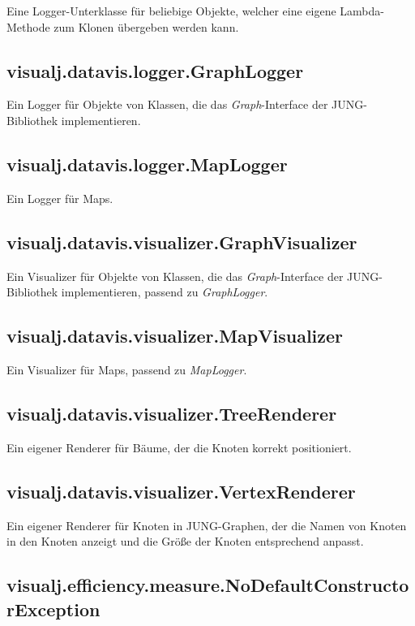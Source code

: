 \documentclass[a4paper]{report}
\begin{document}
Eine Logger-Unterklasse für beliebige Objekte, welcher eine eigene Lambda-Methode zum Klonen übergeben werden kann.

\subsection{visualj.datavis.logger.GraphLogger}

Ein Logger für Objekte von Klassen, die das \emph{Graph}-Interface der JUNG-Bibliothek implementieren.

\subsection{visualj.datavis.logger.MapLogger}

Ein Logger für Maps.

\subsection{visualj.datavis.visualizer.GraphVisualizer}

Ein Visualizer für Objekte von Klassen, die das \emph{Graph}-Interface der JUNG-Bibliothek implementieren, passend zu \emph{GraphLogger}.

\subsection{visualj.datavis.visualizer.MapVisualizer}

Ein Visualizer für Maps, passend zu \emph{MapLogger}.

\subsection{visualj.datavis.visualizer.TreeRenderer}

Ein eigener Renderer für Bäume, der die Knoten korrekt positioniert.

\subsection{visualj.datavis.visualizer.VertexRenderer}

Ein eigener Renderer für Knoten in JUNG-Graphen, der die Namen von Knoten in den Knoten anzeigt und die Größe der Knoten entsprechend anpasst.

\subsection{visualj.efficiency.measure.NoDefaultConstructorException}
\end{document}
